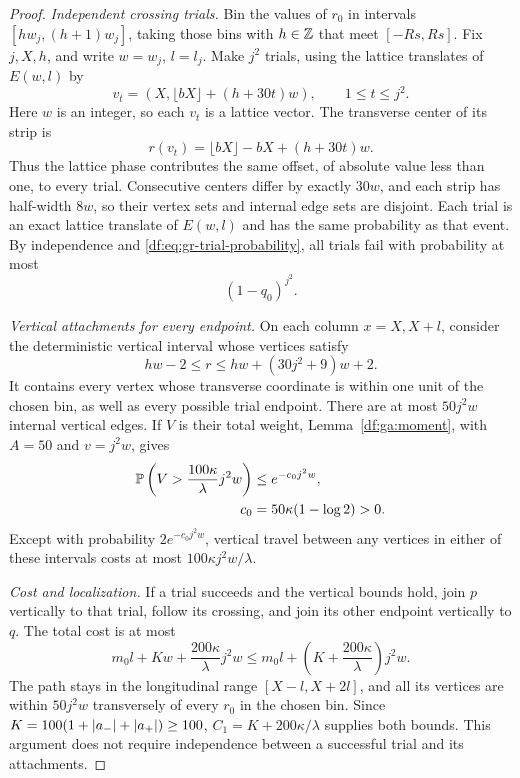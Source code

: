 \begin{proof}
\emph{Independent crossing trials.}
Bin the values of $r_0$ in intervals $[hw_j,(h+1)w_j]$, taking those
bins with $h\in\mathbb Z$ that meet $[-Rs,Rs]$.
Fix $j,X,h$, and write $w=w_j$, $l=l_j$. Make $j^2$ trials, using the
lattice translates of $E(w,l)$ by
\[
 v_t=(X,\lfloor bX\rfloor+(h+30t)w),\qquad1\le t\le j^2.
\]
Here $w$ is an integer, so each $v_t$ is a lattice vector. The
transverse center of its strip is
\[
 r(v_t)=\lfloor bX\rfloor-bX+(h+30t)w.
\]
Thus the lattice phase contributes the same offset, of absolute value
less than one, to every trial. Consecutive centers differ by exactly
$30w$, and each strip has half-width $8w$, so their vertex sets and
internal edge sets are disjoint. Each trial is an exact lattice
translate of $E(w,l)$ and has the same probability as that event.
By independence and \eqref{df:eq:gr-trial-probability}, all trials fail
with probability at most
\begin{equation}\label{df:eq:gr-trial-failure}
 (1-q_0)^{j^2}.
\end{equation}

\emph{Vertical attachments for every endpoint.}
On each column $x=X,X+l$, consider the deterministic vertical
interval whose vertices satisfy
\[
 hw-2\le r\le hw+(30j^2+9)w+2.
\]
It contains every vertex whose transverse coordinate is within one
unit of the chosen bin, as well as every possible trial endpoint. There
are at most $50j^2w$ internal vertical edges. If $V$ is their total
weight, Lemma~\ref{df:ga:moment}, with $A=50$ and $v=j^2w$, gives
\[
 \begin{split}
 \mathbb P\left(V>\frac{100\kappa}{\lambda}j^2w\right)
 &\le e^{-c_0j^2w},\\
 c_0&=50\kappa(1-\log2)>0.
 \end{split}
\]
Except with probability $2e^{-c_0j^2w}$, vertical travel between any
vertices in either of these intervals costs at most
$100\kappa j^2w/\lambda$.

\emph{Cost and localization.}
If a trial succeeds and the vertical bounds hold, join $p$ vertically
to that trial, follow its crossing, and join its other endpoint
vertically to $q$. The total cost is at most
\[
 m_0l+Kw+\frac{200\kappa}{\lambda}j^2w
 \le m_0l+\left(K+\frac{200\kappa}{\lambda}\right)j^2w.
\]
The path stays in the longitudinal range $[X-l,X+2l]$, and all its vertices
are within $50j^2w$ transversely of every $r_0$ in the chosen bin.
Since $K=100(1+\left\lvert a_-\right\rvert+\left\lvert a_+\right\rvert)\ge100$,
$C_1=K+200\kappa/\lambda$ supplies both bounds. This argument does not
require independence between a successful trial and its attachments.


\end{proof}
